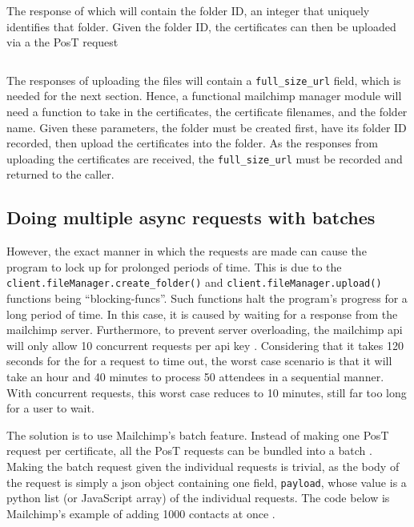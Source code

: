\documentclass[11pt]{article}
\begin{document}
\inputminted[linenos=true]{python}{mailchimp_examples/create_folder.py}

\noindent
The \gls{response} of which will contain the folder ID, an integer that uniquely identifies that folder. Given the folder ID, the certificates can then be uploaded via a the P\acrshort{os}T \gls{request} \cite{mailchimp-add-file}

\inputminted[linenos=true]{python}{mailchimp_examples/upload_file.py}

\noindent
The \gls{response}s of uploading the files will contain a \texttt{full\_size\_url} field, which is needed for the next section. Hence, a functional \Gls{mailchimp} manager module will need a function to take in the certificates, the certificate filenames, and the folder name. Given these parameters, the folder must be created first, have its folder ID recorded, then upload the certificates into the folder. As the \gls{response}s from uploading the certificates are received, the \texttt{full\_size\_url} must be recorded and returned to the caller.

\subsection{Doing multiple async \gls{request}s with \gls{batch}es}

However, the exact manner in which the \gls{request}s are made can cause the program to lock up for prolonged periods of time. This is due to the \texttt{client.fileManager.create_folder()} and \texttt{client.fileManager.upload()} functions being ``\glspl{blocking-func}''. Such functions halt the program's progress for a long period of time. In this case, it is caused by waiting for a \gls{response} from the \Gls{mailchimp} \gls{server}. Furthermore, to prevent \gls{server} overloading, the \Gls{mailchimp} \acrshort{api} will only allow 10 concurrent \gls{request}s per \acrshort{api} key \cite{mailchimp-batch}. Considering that it takes 120 seconds for the for a \gls{request} to time out, the worst case scenario is that it will take an hour and 40 minutes to process 50 attendees in a sequential manner. With concurrent \gls{request}s, this worst case reduces to 10 minutes, still far too long for a \gls{user} to wait.

The solution is to use Mailchimp's \gls{batch} feature. Instead of making one P\acrshort{os}T \gls{request} per certificate, all the P\acrshort{os}T \gls{request}s can be bundled into a \gls{batch} \cite{mailchimp-batch}. Making the \gls{batch} \gls{request} given the individual \gls{request}s is trivial, as the body of the \gls{request} is simply a \acrshort{json} \gls{object} containing one field, \texttt{payload}, whose value is a \Gls{python} list (or JavaScript \gls{array}) of the individual \gls{request}s. The code below is Mailchimp's example of adding 1000 contacts at once \cite{mailchimp-batch}.
\end{document}

